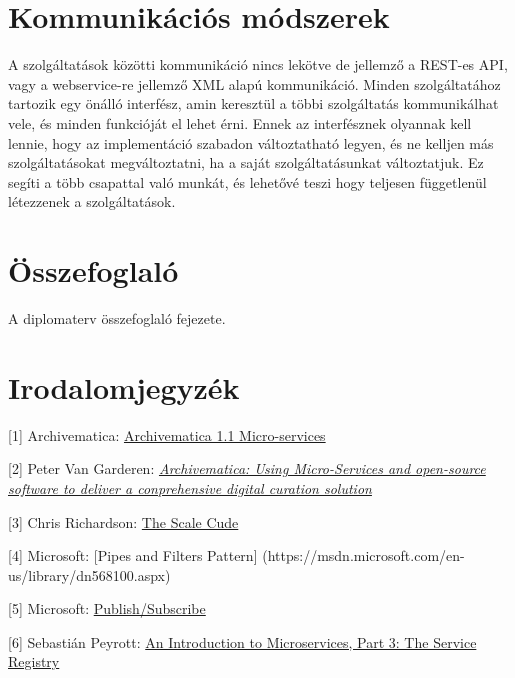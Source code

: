 \documentclass[11pt,magyar,a4paper,oneside,]{report}
\begin{document}
\chapter{Kommunikációs
módszerek}\label{kommunikuxe1ciuxf3s-muxf3dszerek}

A szolgáltatások közötti kommunikáció nincs lekötve de jellemző a
REST-es API, vagy a webservice-re jellemző XML alapú kommunikáció.
Minden szolgáltatához tartozik egy önálló interfész, amin keresztül a
többi szolgáltatás kommunikálhat vele, és minden funkcióját el lehet
érni. Ennek az interfésznek olyannak kell lennie, hogy az implementáció
szabadon változtatható legyen, és ne kelljen más szolgáltatásokat
megváltoztatni, ha a saját szolgáltatásunkat változtatjuk. Ez segíti a
több csapattal való munkát, és lehetővé teszi hogy teljesen függetlenül
létezzenek a szolgáltatások.

\chapter{Összefoglaló}\label{uxf6sszefoglaluxf3}

A diplomaterv összefoglaló fejezete.

\chapter*{Irodalomjegyzék}\label{irodalomjegyzuxe9k}

{[}1{]} Archivematica:
\href{https://wiki.archivematica.org/Archivematica_1.1_Micro-services}{Archivematica
1.1 Micro-services}

{[}2{]} Peter Van Garderen:
\href{http://citeseerx.ist.psu.edu/viewdoc/download?doi=10.1.1.384.7168\&rep=rep1\&type=pdf\#page=145}{\emph{Archivematica:
Using Micro-Services and open-source software to deliver a conprehensive
digital curation solution}}

{[}3{]} Chris Richardson:
\href{http://microservices.io/articles/scalecube.html}{The Scale Cude}

{[}4{]} Microsoft: {[}Pipes and Filters Pattern{]}
(https://msdn.microsoft.com/en-us/library/dn568100.aspx)

{[}5{]} Microsoft:
\href{https://msdn.microsoft.com/en-us/library/ff649664.aspx}{Publish/Subscribe}

{[}6{]} Sebastián Peyrott:
\href{https://auth0.com/blog/2015/10/02/an-introduction-to-microservices-part-3-the-service-registry/}{An
Introduction to Microservices, Part 3: The Service Registry}
\end{document}
